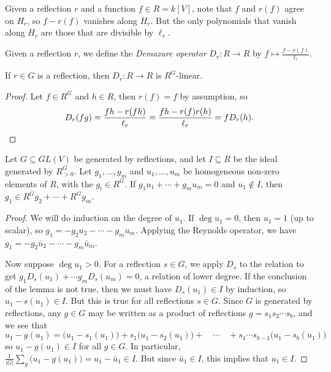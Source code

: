 Given a reflection $r$ and a function $f\in R=k[V]$, note that $f$ and $r(f)$ agree on $H_r$, so $f-r(f)$ vanishes along $H_r$. But the only polynomials that vanish along $H_r$ are those that are divisible by $\ell_r$.
\begin{definition}
 Given a reflection $r$, we define the \emph{Demazure operator} $D_r\colon R\to R$ by $f\mapsto \displaystyle \frac{f-r(f)}{\ell_r}$.
\end{definition}
\begin{lemma}
 If $r\in G$ is a reflection, then $D_r\colon R\to R$ is $R^G$-linear.
\end{lemma}
\begin{proof}
 Let $f\in R^G$ and $h\in R$, then $r(f)=f$ by assumption, so
 \[
  D_r(fg)= \frac{fh-r(fh)}{\ell_r}=\frac{fh-r(f)r(h)}{\ell_r}=fD_r(h).\qedhere
 \]
\end{proof}

\begin{lemma}\label{lec5Lem:R_G}
 Let $G\subseteq GL(V)$ be generated by reflections, and let $I\subseteq R$ be the ideal generated by $R_{>0}^G$. Let $g_1,\dots, g_m$ and $u_1,\dots, u_m$ be homogeneous non-zero elements of $R$, with the $g_i\in R^G$. If $g_1u_1+\cdots + g_mu_m=0$ and $u_1\not\in I$, then $g_1\in R^Gg_2+\cdots + R^G g_m$.
\end{lemma}
\begin{proof}
 We will do induction on the degree of $u_1$. If $\deg u_1=0$, then $u_1=1$ (up to scalar), so $g_1=-g_2u_2-\cdots -g_mu_m$. Applying the Reynolds operator, we have $g_1=-g_2\bar u_2-\cdots -g_m\bar u_m$.
 
 Now suppose $\deg u_1>0$. For a reflection $s\in G$, we apply $D_s$ to the relation to get $g_1D_s(u_1)+\cdots g_mD_s(u_m)=0$, a relation of lower degree. If the conclusion of the lemma is not true, then we must have $D_s(u_1)\in I$ by induction, so $u_1-s(u_1)\in I$. But this is true for all reflections $s\in G$. Since $G$ is generated by reflections, any $g\in G$ may be written as a product of reflections $g=s_1s_2\cdots s_b$, and we see that
 \[
  u_1-g(u_1)= \bigl(u_1-s_1(u_1)\bigr)+s_1\bigl(u_1-s_2(u_1)\bigr)+\quad\cdots\quad + s_1\cdots s_{b-1}\bigl(u_1-s_b(u_1)\bigr)
 \]
 so $u_1-g(u_1)\in I$ for all $g\in G$. In particular, $\frac{1}{|G|}\sum_g \bigl(u_1-g(u_1)\bigr)=u_1-\bar u_1\in I$. But since $\bar u_1\in I$, this implies that $u_1\in I$.
\end{proof}

